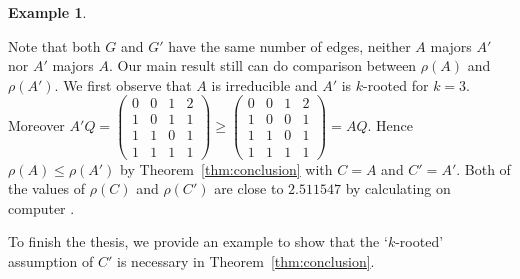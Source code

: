 \documentclass[12pt, a4paper]{article}
\theoremstyle{plain}
\theoremstyle{definition}
\newtheorem{exam}[thm]{Example}
\begin{document}
\begin{exam}
\begin{center}
\end{center}


Note that both $G$ and $G'$ have the same number of edges, 
neither $A$ majors $A'$ nor $A'$ majors $A$. Our main result still can do comparison between 
$\rho(A)$ and $\rho(A')$. 
We first observe that $A$ is irreducible and $A'$ is $k$-rooted for $k=3$. Moreover 
$A'Q=\begin{pmatrix}
    0 & 0 & 1 & 2\\
    1 & 0 & 1 & 1\\
    1 & 1 & 0 & 1\\
    1 & 1 & 1 & 1
    \end{pmatrix}\geq \begin{pmatrix}
    0 & 0 & 1 & 2\\
    1 & 0 & 0 & 1\\
    1 & 1 & 0 & 1\\
    1 & 1 & 1 & 1
    \end{pmatrix}=AQ$. 
Hence $\rho(A)\leq\rho(A')$ by Theorem~\ref{thm:conclusion} with $C=A$ and $C'=A'$. 
Both of the values of $\rho(C)$ and $\rho(C')$ are close to $2.511547$ by  calculating on computer \cite[sage]{sage}.
\end{exam}

To finish the thesis, we provide an example to show that the `$k$-rooted' assumption of $C'$ is necessary in Theorem~\ref{thm:conclusion}. 
\end{document}
